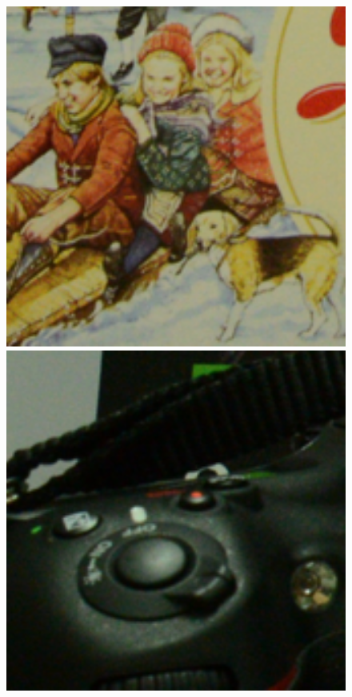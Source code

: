 \documentclass[10pt,twocolumn,letterpaper]{article}
\begin{document}
\begin{figure}[t]
{\begin{minipage}{0.055\textwidth}
\end{minipage}
\begin{minipage}{0.055\textwidth}
\includegraphics[width=1\textwidth]{images/resize_CC_Noisy_Nikon_D600_ISO_3200_C1_95.png}
\end{minipage}
\begin{minipage}{0.055\textwidth}
\includegraphics[width=1\textwidth]{images/resize_CC_Noisy_Nikon_D600_ISO_3200_C2_67.png}

\end{minipage}}
\end{figure}
\end{document}
